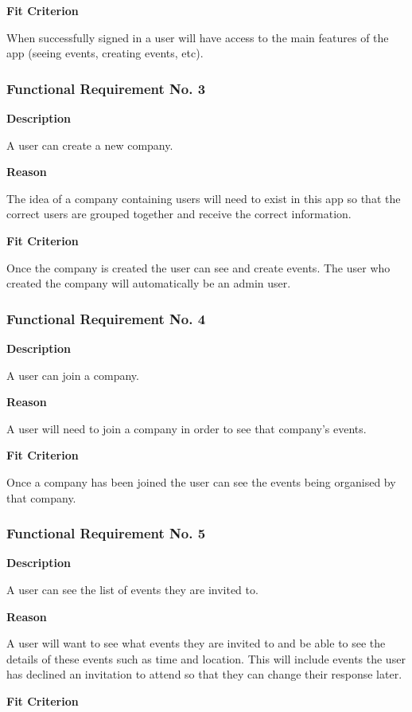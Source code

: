 \textbf{Fit Criterion}

When successfully signed in a user will have access to the main features of the app (seeing events, creating events, etc).

\subsubsection{Functional Requirement No. 3}

\textbf{Description}

A user can create a new company.

\textbf{Reason}

The idea of a company containing users will need to exist in this app so that the correct users are grouped together and receive the correct information.

\textbf{Fit Criterion}

Once the company is created the user can see and create events. The user who created the company will automatically be an admin user.

\subsubsection{Functional Requirement No. 4}

\textbf{Description}

A user can join a company.

\textbf{Reason}

A user will need to join a company in order to see that company's events.

\textbf{Fit Criterion}

Once a company has been joined the user can see the events being organised by that company.

\subsubsection{Functional Requirement No. 5}

\textbf{Description}

A user can see the list of events they are invited to.

\textbf{Reason}

A user will want to see what events they are invited to and be able to see the details of these events such as time and location. This will include events the user has declined an invitation to attend so that they can change their response later.

\textbf{Fit Criterion}

